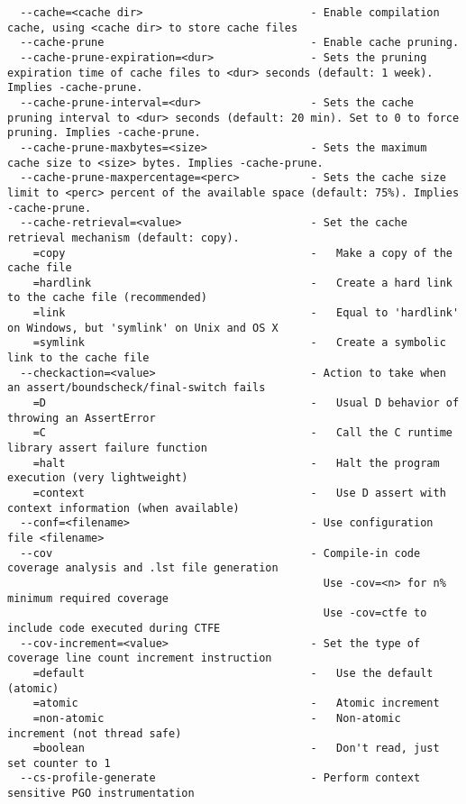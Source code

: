 \documentclass{studrep}
\begin{document}
\begin{verbatim}
  --cache=<cache dir>                          - Enable compilation cache, using <cache dir> to store cache files
  --cache-prune                                - Enable cache pruning.
  --cache-prune-expiration=<dur>               - Sets the pruning expiration time of cache files to <dur> seconds (default: 1 week). Implies -cache-prune.
  --cache-prune-interval=<dur>                 - Sets the cache pruning interval to <dur> seconds (default: 20 min). Set to 0 to force pruning. Implies -cache-prune.
  --cache-prune-maxbytes=<size>                - Sets the maximum cache size to <size> bytes. Implies -cache-prune.
  --cache-prune-maxpercentage=<perc>           - Sets the cache size limit to <perc> percent of the available space (default: 75%). Implies -cache-prune.
  --cache-retrieval=<value>                    - Set the cache retrieval mechanism (default: copy).
    =copy                                      -   Make a copy of the cache file
    =hardlink                                  -   Create a hard link to the cache file (recommended)
    =link                                      -   Equal to 'hardlink' on Windows, but 'symlink' on Unix and OS X
    =symlink                                   -   Create a symbolic link to the cache file
  --checkaction=<value>                        - Action to take when an assert/boundscheck/final-switch fails
    =D                                         -   Usual D behavior of throwing an AssertError
    =C                                         -   Call the C runtime library assert failure function
    =halt                                      -   Halt the program execution (very lightweight)
    =context                                   -   Use D assert with context information (when available)
  --conf=<filename>                            - Use configuration file <filename>
  --cov                                        - Compile-in code coverage analysis and .lst file generation
                                                 Use -cov=<n> for n% minimum required coverage
                                                 Use -cov=ctfe to include code executed during CTFE
  --cov-increment=<value>                      - Set the type of coverage line count increment instruction
    =default                                   -   Use the default (atomic)
    =atomic                                    -   Atomic increment
    =non-atomic                                -   Non-atomic increment (not thread safe)
    =boolean                                   -   Don't read, just set counter to 1
  --cs-profile-generate                        - Perform context sensitive PGO instrumentation

\end{verbatim}
\end{document}
